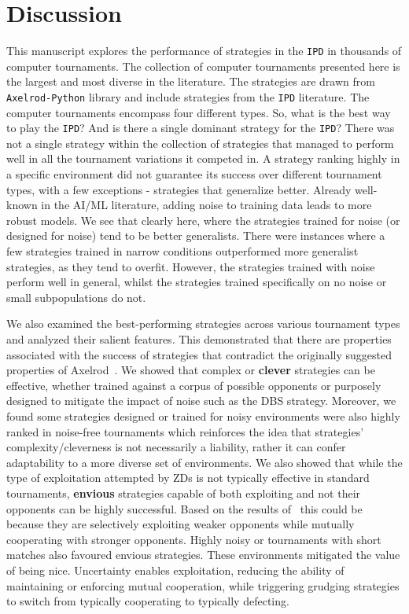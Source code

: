 \documentclass{article}
\newcommand{\numberofstrategies}{}
\def\axelrod{\texttt{Axelrod-Python}}
\def\IPD{\texttt{IPD}}
\begin{document}
\section{Discussion}\label{section:conclusion}

This manuscript explores the performance of \numberofstrategies strategies in
the \IPD{} in thousands of computer tournaments. The collection of computer
tournaments presented here is the largest and most diverse in the literature.
The \numberofstrategies strategies are drawn from \axelrod{} library and include
strategies from the \IPD{} literature. The computer tournaments encompass four
different types. So, what is the best way to play the \IPD{}? And is there a
single dominant strategy for the \IPD{}? There was not a single strategy within
the collection of \numberofstrategies strategies that managed to perform well in
all the tournament variations it competed in. A strategy ranking highly in a
specific environment did not guarantee its success over different tournament
types, with a few exceptions - strategies that generalize better. Already
well-known in the AI/ML literature, adding noise to training data leads to more
robust models. We see that clearly here, where the strategies trained for noise
(or designed for noise) tend to be better generalists. There were instances
where a few strategies trained in narrow conditions outperformed more generalist
strategies, as they tend to overfit. However, the strategies trained with noise
perform well in general, whilst the strategies trained specifically on no noise
or small subpopulations do not.

We also examined the best-performing strategies across various tournament
types and analyzed their salient features. This demonstrated that there are
properties associated with the success of strategies that contradict the
originally suggested properties of Axelrod~\cite{Axelrod1981}.
We showed that complex or \textbf{clever} strategies can be effective, whether
trained against a corpus of possible opponents or purposely designed to mitigate
the impact of noise such as the DBS strategy. Moreover, we found some
strategies designed or trained for noisy environments were also highly ranked in
noise-free tournaments which reinforces the idea that strategies'
complexity/cleverness is not necessarily a liability, rather it can confer
adaptability to a more diverse set of environments.
We also showed that while the type of exploitation attempted by ZDs is
not typically effective in standard tournaments, \textbf{envious} strategies
capable of both exploiting and not their opponents can be highly successful.
Based on the results of~\cite{Harper2017} this could be because they are
selectively exploiting weaker opponents while mutually cooperating with stronger
opponents. Highly noisy or tournaments with short matches also favoured envious
strategies. These environments mitigated the value of being nice. Uncertainty
enables exploitation, reducing the ability of maintaining or enforcing mutual
cooperation, while triggering grudging strategies to switch from typically
cooperating to typically defecting.
\end{document}
